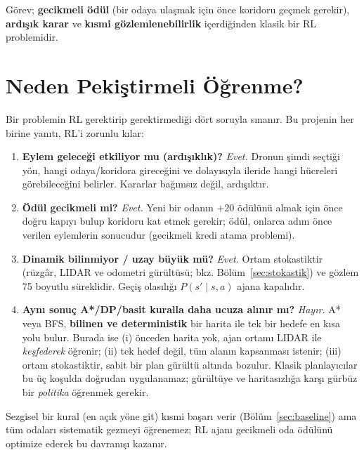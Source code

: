 \documentclass[11pt,a4paper]{article}
\begin{document}
Görev; \textbf{gecikmeli ödül} (bir odaya ulaşmak için önce koridoru geçmek
gerekir), \textbf{ardışık karar} ve \textbf{kısmi gözlemlenebilirlik}
içerdiğinden klasik bir RL problemidir.

\section{Neden Pekiştirmeli Öğrenme?}
Bir problemin RL gerektirip gerektirmediği dört soruyla sınanır. Bu projenin
her birine yanıtı, RL'i zorunlu kılar:

\begin{enumerate}[noitemsep]
  \item \textbf{Eylem geleceği etkiliyor mu (ardışıklık)?} \emph{Evet.} Dronun
  şimdi seçtiği yön, hangi odaya/koridora gireceğini ve dolayısıyla ileride
  hangi hücreleri görebileceğini belirler. Kararlar bağımsız değil, ardışıktır.
  \item \textbf{Ödül gecikmeli mi?} \emph{Evet.} Yeni bir odanın $+20$ ödülünü
  almak için önce doğru kapıyı bulup koridoru kat etmek gerekir; ödül, onlarca
  adım önce verilen eylemlerin sonucudur (gecikmeli kredi atama problemi).
  \item \textbf{Dinamik bilinmiyor / uzay büyük mü?} \emph{Evet.} Ortam
  stokastiktir (rüzgâr, LIDAR ve odometri gürültüsü; bkz. Bölüm~\ref{sec:stokastik}) ve gözlem
  75 boyutlu süreklidir. Geçiş olasılığı $P(s'\mid s,a)$ ajana kapalıdır.
  \item \textbf{Aynı sonuç A*/DP/basit kuralla daha ucuza alınır mı?}
  \emph{Hayır.} A* veya BFS, \textbf{bilinen ve deterministik} bir harita ile
  tek bir hedefe en kısa yolu bulur. Burada ise (i) önceden harita yok, ajan
  ortamı LIDAR ile \emph{keşfederek} öğrenir; (ii) tek hedef değil, tüm alanın
  kapsanması istenir; (iii) ortam stokastiktir, sabit bir plan gürültü altında
  bozulur. Klasik planlayıcılar bu üç koşulda doğrudan uygulanamaz; gürültüye
  ve haritasızlığa karşı gürbüz bir \emph{politika} öğrenmek gerekir.
\end{enumerate}

\noindent Sezgisel bir kural (en açık yöne git) kısmi başarı verir (Bölüm~\ref{sec:baseline})
ama tüm odaları sistematik gezmeyi öğrenemez; RL ajanı gecikmeli oda ödülünü
optimize ederek bu davranışı kazanır.

\end{document}
